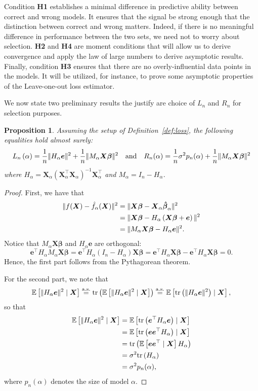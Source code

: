 \documentclass[12pt, letter paper]{article}
\newcommand{\1}{\mathmybb{1}}
\newtheorem{proposition}{Proposition}[section]
\newcommand{\0}{\emptyset}
\newcommand{\Ep}[1]{\mathbb{E}\left[ #1 \right]}
\newcommand{\paren}[1]{\left(#1 \right)}
\newcommand{\norm}[1]{|\hspace{-1pt}|#1 |\hspace{-1pt}|}
\newcommand{\normsq}[1]{\norm{#1}^{2}}
\newcommand{\aseq}{\stackrel{\mathrm{a.s.}}{=}}
\newcommand{\X}{\boldsymbol{X}}
\newcommand{\e}{\boldsymbol{e}}
\newcommand{\bbeta}{\boldsymbol{\beta}}
\newcommand{\bbetahat}{\boldsymbol{\hat{\beta}}}
\newcommand{\Loss}[1]{L_{n}\paren{#1}}
\newcommand{\tr}[1]{\mathrm{tr}\paren{#1}}
\begin{document}
Condition \textbf{H1} establishes a minimal difference in predictive ability between correct and wrong models. It ensures that the signal be strong enough that the distinction between correct and wrong matters. Indeed, if there is no meaningful difference in performance between the two sets, we need not to worry about selection.
\textbf{H2} and \textbf{H4} are moment conditions that will allow us to derive convergence and apply the law of large numbers to derive asymptotic results.
Finally, condition \textbf{H3} ensures that there are no overly-influential data points in the models. It will be utilized, for instance, to prove some asymptotic properties of the Leave-one-out loss estimator.

We now state two preliminary results the justify are choice of \(L_{n}\) and \(R_{n}\) for selection purposes. 

\begin{proposition}
    Assuming the setup of Definition~\ref{def:loss}, the following equalities hold almost surely:
    \[\Loss{\alpha} = \frac{1}{n}\normsq{H_{\alpha}\e} + \frac{1}{n}\normsq{M_{\alpha}\X\bbeta}\quad\text{and}\quad R_{n}(\alpha) = \frac{1}{n}\sigma^{2}p_{n}(\alpha) + \frac{1}{n}\normsq{M_{\alpha}\X\bbeta}\]
    where \(H_{\alpha} = \X_{\alpha}\paren{\X_{\alpha}^{\top}\X_{\alpha}}^{-1}\X_{\alpha}^{\top}\) and \(M_{\alpha}= I_{n} - H_{\alpha}\).
\end{proposition}

\begin{proof}
    First, we have that
    \begin{align*}
        \normsq{f(\X) - \hat{f}_{\alpha}(\X)} &= \normsq{\X\bbeta - \X_{\alpha}\bbetahat_{\alpha}}\\
        &= \normsq{\X\bbeta - H_{\alpha}\paren{\X\bbeta + \e}}\\
        &= \normsq{M_{\alpha}\X\bbeta - H_{\alpha}\e}.
    \end{align*}
    Notice that \(M_{\alpha}\X\bbeta\) and \(H_{\alpha}\e\) are orthogonal:
    \[\e^{\top}H_{\alpha}M_{\alpha}\X\bbeta  = \e^{\top}H_{\alpha}\paren{I_{n} - H_{\alpha}}\X\bbeta = \e^{\top}H_{\alpha}\X\bbeta - \e^{\top}H_{\alpha}\X\bbeta = 0.\]
    Hence, the first part follows from the Pythagorean theorem.

    For the second part, we note that \[\Ep{\normsq{H_{\alpha}\e}\mid\X} \aseq \tr{\Ep{\normsq{H_{\alpha}\e}\mid\X}} \aseq \Ep{\tr{\normsq{H_{\alpha}\e}}\mid\X},\]
    so that
    \begin{align*}
        \Ep{\normsq{H_{\alpha}\e}\mid\X} &= \Ep{\tr{\e^{\top}H_{\alpha}\e}\mid\X}\\
        &= \Ep{\tr{\e\e^{\top}H_{\alpha}}\mid\X}\\
        &= \tr{\Ep{\e\e^{\top}\mid\X}H_{\alpha}}\\
        &= \sigma^2\tr{H_{\alpha}}\\
        &= \sigma^{2}p_{n}(\alpha),
    \end{align*}
    where \(p_{n}(\alpha)\) denotes the size of model \(\alpha\).
\end{proof}
\end{document}
